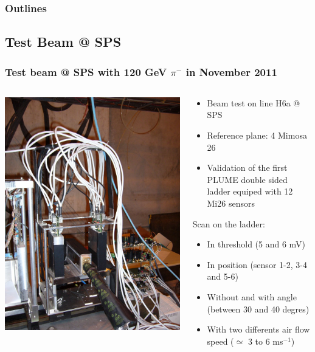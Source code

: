 \documentclass{beamer}
\begin{document}
  \begin{frame}
    \frametitle{Outlines}
    \tableofcontents[currentsection]
  \end{frame}


  \subsection{Test Beam @ SPS}
  \begin{frame}
    \frametitle{Test beam @ SPS with 120 GeV $\pi^- $ in November 2011}

    \begin{columns}[t]
      \begin{column}{4cm}
        \begin{center}
          \includegraphics[width = 4 cm]{Pictures/plume_testBeam_nov2011.jpg}
        \end{center}
      \end{column}

      \begin{column}{7cm}
        \vspace{-0.8cm}
        \begin{itemize}
          \item Beam test on line H6a @ SPS
          \item Reference plane: 4 Mimosa 26
          \item Validation of the first PLUME double sided ladder equiped with 12 Mi26 sensors
        \end{itemize}

        \vspace{-0.3cm}
        \begin{block}{Scan on the ladder:}
          \begin{itemize}
            \item In threshold (5 and 6 mV)
            \item In position (sensor 1-2, 3-4 and 5-6)
            \item Without and with angle (between 30 and 40 degres)
            \item With two differents air flow speed ($\simeq$ 3 to 6 ms$^{-1}$)
          \end{itemize}
        \end{block}
      \end{column}
    \end{columns}


\end{frame}
\end{document}
